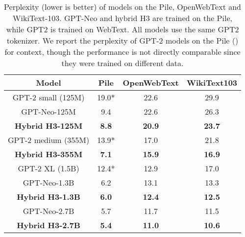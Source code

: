 \documentclass{article}
\newcommand{\hthree}{\textsc{H3}\xspace}
\begin{document}
\begin{table}[t]
\small
    \centering
\caption{\label{table:gpt} Perplexity (lower is better) of models on the Pile, OpenWebText and
      WikiText-103. GPT-Neo and hybrid \hthree are trained on the Pile, while GPT2 is
      trained on WebText. All models use the same GPT2 tokenizer. We report the
      perplexity of GPT-2 models on the Pile () for context, though the performance is not directly comparable since they were trained on different data.}
{
      \begin{tabular}{@{}|c|c|cc|@{}}
\hline
        Model & Pile & OpenWebText & WikiText103 \\ \hline
GPT-2 small (125M) & 19.0* & 22.6 & 29.9 \\
        GPT-Neo-125M & 9.4 & 22.6 & 26.3 \\
\textbf{Hybrid H3-125M} & \textbf{8.8} & \textbf{20.9} & \textbf{23.7} \\ \hline GPT-2 medium (355M) & 13.9* & 17.0 & 21.8 \\ \textbf{Hybrid H3-355M} & \textbf{7.1} & \textbf{15.9} & \textbf{16.9} \\ \hline
        GPT-2 XL (1.5B) & 12.4* & 12.9 & 17.0 \\
GPT-Neo-1.3B & 6.2 & 13.1 & 13.3 \\
        \textbf{Hybrid H3-1.3B} & \textbf{6.0} & \textbf{12.4} & \textbf{12.5} \\
        \hline
        GPT-Neo-2.7B & 5.7 & 11.7 & 11.5 \\
        \textbf{Hybrid H3-2.7B} & \textbf{5.4} & \textbf{11.0} & \textbf{10.6} \\
        \hline
      \end{tabular}
    }
\end{table}
\end{document}
